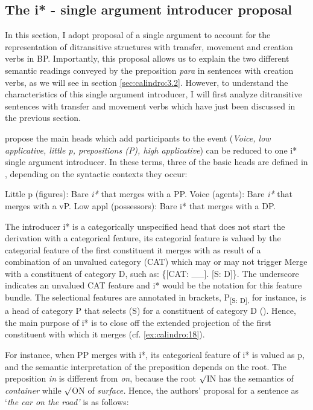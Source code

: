 \documentclass[output=paper,colorlinks,citecolor=brown,nonflat]{./langscibook}
\begin{document}
\subsection{The i* - single argument introducer proposal}\label{sec:calindro:3.1}

In this section, I adopt  proposal of a single argument to account for the representation of ditransitive structures with transfer, movement and creation verbs in BP. Importantly, this proposal allows us to explain the two different semantic readings conveyed by the preposition \textit{para} in sentences with creation verbs, as we will see in section \ref{sec:calindro:3.2}. However, to understand the characteristics of this single argument introducer, I will first analyze ditransitive sentences with transfer and movement verbs which have just been discussed in the previous section.

\citet{WoodMarantz2017} propose the main heads which add participants to the event (\textit{Voice, low applicative, little p, prepositions (P), high applicative}) can be reduced to one i* single argument introducer. In these terms, three of the basic heads are defined in , depending on the syntactic contexts they occur:

\ea%
    \label{ex:calindro:17}
    \ea\label{ex:calindro:17a} Little p (figures): Bare \textit{i*} that merges with a PP.
    \ex\label{ex:calindro:17b} Voice (agents): Bare \textit{i*} that merges with a vP.
    \ex\label{ex:calindro:17c} Low appl (possessors): Bare i* that merges with a DP. \hfill \citep[258]{WoodMarantz2017}
    \z
\z

The introducer i* is a categorically unspecified head that does not start the derivation with a categorical feature, its categorial feature is valued by the categorial feature of the first constituent it merges with as result of a combination of an unvalued category (CAT) which may or may not trigger Merge with a constituent of category D, such as: \{[CAT: \_\_]. [S: D]\}. The underscore indicates an unvalued CAT feature and i* would be the notation for this feature bundle. The selectional features are annotated in brackets, P\textsubscript{[S: D],} for instance,\textsubscript{}  is a head of category P that selects (S) for a constituent of category D (\citealt[257]{WoodMarantz2017}). Hence, the main purpose of i* is to close off the extended projection of the first constituent with which it merges (cf. \ref{ex:calindro:18}). 

For instance, when PP merges with i*, its categorical feature of i* is valued as p, and the semantic interpretation of the preposition depends on the root. The preposition \textit{in} is different from \textit{on}, because the root ${\surd}$IN has the semantics of \textit{container} while ${\surd}$ON of \textit{surface.} Hence, the authors’ proposal for a sentence as ‘\textit{the car on the road’} is as follows:
\end{document}
